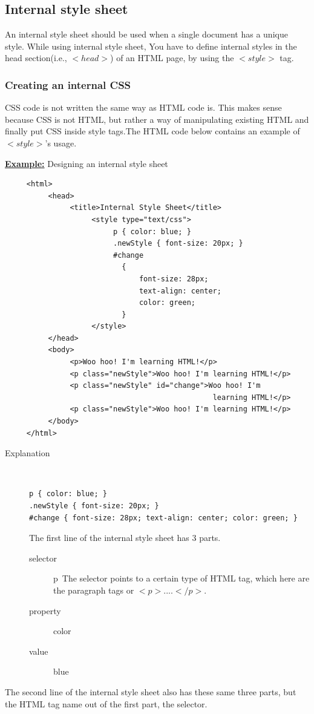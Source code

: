 \documentclass[11pt,a4paper]{article}
\begin{document}
\subsection*{Internal style sheet}

An internal style sheet should be used when a single document has a unique style. While using internal style sheet, You have to define internal styles in the head section(i.e., $<head>$) of an HTML page, by using the $<style>$ tag.


\subsubsection*{Creating an internal CSS}

CSS code is not written the same way as HTML code is. This makes sense because CSS is not HTML, but rather a way of manipulating existing HTML and finally put CSS inside style tags.The HTML code below contains an example of $<style>$'s usage.


\underline{\textbf{Example:}} Designing an internal style sheet 
\begin{verbatim}
     <html>
          <head>
               <title>Internal Style Sheet</title>
                    <style type="text/css">
                         p { color: blue; }
                         .newStyle { font-size: 20px; }
                         #change
                           {
                               font-size: 28px;
                               text-align: center;
                               color: green;
                           }
                    </style>
          </head>
          <body>
               <p>Woo hoo! I'm learning HTML!</p>
               <p class="newStyle">Woo hoo! I'm learning HTML!</p>
               <p class="newStyle" id="change">Woo hoo! I'm 
                                                learning HTML!</p>
               <p class="newStyle">Woo hoo! I'm learning HTML!</p>
          </body>
     </html>
\end{verbatim}
\begin{description}
\item[Explanation]\
\begin{verbatim}
p { color: blue; }
.newStyle { font-size: 20px; }
#change { font-size: 28px; text-align: center; color: green; }
\end{verbatim}
The first line of the internal style sheet has 3 parts.
\begin{description}
\item[selector] p\
The selector points to a certain type of HTML tag, which here are the paragraph tags or $<p>$....$</p>$.
\item[property] color
\item[value] blue
\end{description}
\end{description}
The second line of the internal style sheet also has these same three parts, but the HTML tag name out of the first part, the selector.
\end{document}
